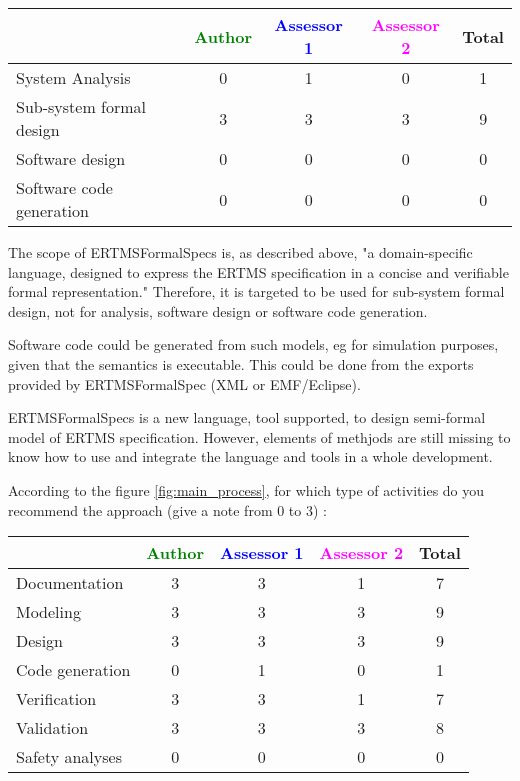 \begin{tabular}{|l | c | c | c | c|}
\hline
& \textcolor{green}{Author} & \textcolor{blue}{Assessor 1} & \textcolor{magenta}{Assessor 2} & Total \\
\hline 
System Analysis & 0 & 1 & 0 & 1 \\
\hline
Sub-system formal design & 3 & 3 & 3 & 9 \\
\hline
Software design & 0 & 0 & 0 & 0 \\
\hline
Software code generation & 0 & 0 & 0 & 0 \\
\hline
\end{tabular}

\begin{author_comment}
The scope of ERTMSFormalSpecs is, as described above, "a domain-specific language, designed to express the ERTMS specification in a concise and verifiable formal representation."
Therefore, it is targeted to be used for sub-system formal design, not for analysis, software design or software code generation.
\end{author_comment}

\begin{assessor1}
Software code could be generated from such models, eg for simulation purposes, given that the semantics is executable. This could be done from the exports provided by ERTMSFormalSpec (XML or EMF/Eclipse). 
\end{assessor1}

\begin{assessor2}
ERTMSFormalSpecs is a new language, tool supported, to design semi-formal model of ERTMS specification. However, elements of methjods are still missing to know how to use and integrate the language and tools in a whole development. 
\end{assessor2}

According to the figure \ref{fig:main_process}, for which type of activities do you recommend the approach (give a note from 0 to  3) :

\begin{tabular}{|l | c | c | c | c|}
\hline
& \textcolor{green}{Author} & \textcolor{blue}{Assessor 1} & \textcolor{magenta}{Assessor 2} & Total \\
\hline 
Documentation & 3 & 3 & 1 & 7 \\
\hline
Modeling & 3 & 3 & 3 & 9 \\
\hline
Design & 3 & 3 & 3 & 9 \\
\hline
Code generation & 0 & 1 & 0 & 1\\
\hline
Verification & 3 & 3 & 1 & 7 \\
\hline
Validation & 3 & 3 & 3 & 8 \\
\hline
Safety analyses & 0 & 0 & 0 & 0 \\
\hline
\end{tabular}

